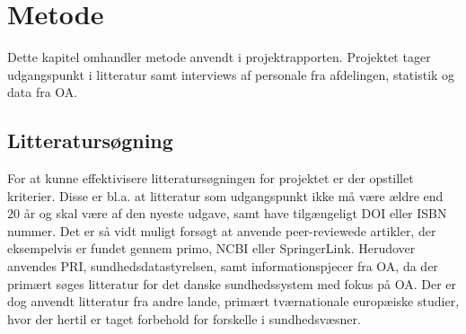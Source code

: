 \chapter{Metode}

Dette kapitel omhandler metode anvendt i projektrapporten. Projektet tager udgangspunkt i litteratur samt interviews af personale fra afdelingen, statistik og data fra OA. 


\section{Litteratursøgning}
For at kunne effektivisere litteratursøgningen for projektet er der opstillet kriterier. Disse er bl.a. at litteratur som udgangspunkt ikke må være ældre end $20$ år og skal være af den nyeste udgave, samt have tilgængeligt DOI eller ISBN nummer. 
Det er så vidt muligt forsøgt at anvende peer-reviewede artikler, der eksempelvis er fundet gennem primo, NCBI eller SpringerLink. Herudover anvendes PRI, sundhedsdatastyrelsen, samt informationspjecer fra OA, da der primært søges litteratur for det danske sundhedssystem med fokus på OA. Der er dog anvendt litteratur fra andre lande, primært tværnationale europæiske studier, hvor der hertil er taget forbehold for forskelle i sundhedsvæsner.



